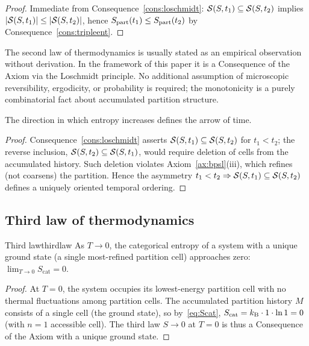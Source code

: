 \begin{proof}
Immediate from Consequence~\ref{cons:loschmidt}: $\mathcal{S}(S,t_{1})\subseteq\mathcal{S}(S,t_{2})$ implies $|\mathcal{S}(S,t_{1})|\le|\mathcal{S}(S,t_{2})|$, hence $S_{\mathrm{part}}(t_{1})\le S_{\mathrm{part}}(t_{2})$ by Consequence~\ref{cons:tripleent}.
\end{proof}

\begin{remark}
The second law of thermodynamics is usually stated as an empirical observation without derivation. In the framework of this paper it is a Consequence of the Axiom via the Loschmidt principle. No additional assumption of microscopic reversibility, ergodicity, or probability is required; the monotonicity is a purely combinatorial fact about accumulated partition structure.
\end{remark}

\begin{proposition}
\label{prop:arrowtime}
The direction in which entropy increases defines the arrow of time.
\end{proposition}

\begin{proof}
Consequence~\ref{cons:loschmidt} asserts $\mathcal{S}(S,t_{1})\subseteq\mathcal{S}(S,t_{2})$ for $t_{1}<t_{2}$; the reverse inclusion, $\mathcal{S}(S,t_{2})\subseteq\mathcal{S}(S,t_{1})$, would require deletion of cells from the accumulated history. Such deletion violates Axiom~\ref{ax:bpsl}(iii), which refines (not coarsens) the partition. Hence the asymmetry $t_{1}<t_{2}\Rightarrow\mathcal{S}(S,t_{1})\subseteq\mathcal{S}(S,t_{2})$ defines a uniquely oriented temporal ordering.
\end{proof}

\subsection{Third law of thermodynamics}

\begin{consequence}{Third law}{thirdlaw}
As $T\to 0$, the categorical entropy of a system with a unique ground state (a single most-refined partition cell) approaches zero: $\lim_{T\to 0}S_{\text{cat}}=0$.
\end{consequence}

\begin{proof}
At $T=0$, the system occupies its lowest-energy partition cell with no thermal fluctuations among partition cells. The accumulated partition history $M$ consists of a single cell (the ground state), so by~\eqref{eq:Scat}, $S_{\text{cat}}=k_{\mathrm{B}}\cdot 1\cdot\ln 1=0$ (with $n=1$ accessible cell). The third law $S\to 0$ at $T=0$ is thus a Consequence of the Axiom with a unique ground state.
\end{proof}

